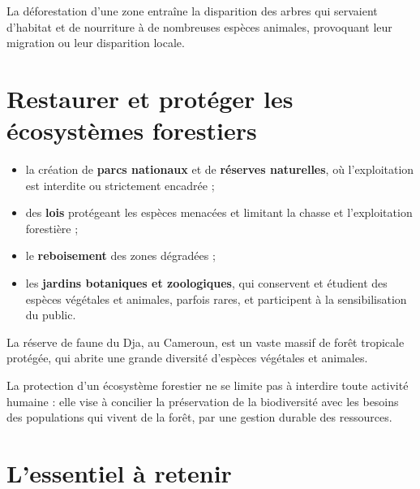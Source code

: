 \begin{exemple}
La déforestation d'une zone entraîne la disparition des arbres qui servaient
d'habitat et de nourriture à de nombreuses espèces animales, provoquant leur
migration ou leur disparition locale.
\end{exemple}

\section{Restaurer et protéger les écosystèmes forestiers}

\begin{propriete}
\begin{itemize}
\item la création de \textbf{parcs nationaux} et de \textbf{réserves naturelles}, où
l'exploitation est interdite ou strictement encadrée ;
\item des \textbf{lois} protégeant les espèces menacées et limitant la chasse et
l'exploitation forestière ;
\item le \textbf{reboisement} des zones dégradées ;
\item les \textbf{jardins botaniques et zoologiques}, qui conservent et étudient des
espèces végétales et animales, parfois rares, et participent à la sensibilisation du
public.
\end{itemize}
\end{propriete}

\begin{exemple}
La réserve de faune du Dja, au Cameroun, est un vaste massif de forêt tropicale
protégée, qui abrite une grande diversité d'espèces végétales et animales.
\end{exemple}

\begin{remarque}
La protection d'un écosystème forestier ne se limite pas à interdire toute activité
humaine : elle vise à concilier la préservation de la biodiversité avec les besoins
des populations qui vivent de la forêt, par une gestion durable des ressources.
\end{remarque}

\section{L'essentiel à retenir}

